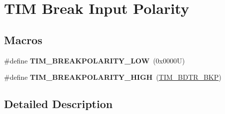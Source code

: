 \hypertarget{group___t_i_m___break___polarity}{}\section{T\+IM Break Input Polarity}
\label{group___t_i_m___break___polarity}
\subsection*{Macros}
\begin{DoxyCompactItemize}
\item 
\mbox{\label{group___t_i_m___break___polarity_ga3e07cb0376c1bf561341dc8befb66208}} 
\#define {\bfseries T\+I\+M\+\_\+\+B\+R\+E\+A\+K\+P\+O\+L\+A\+R\+I\+T\+Y\+\_\+\+L\+OW}~(0x0000\+U)
\item 
\mbox{\label{group___t_i_m___break___polarity_ga97c30f1134accd61e3e42ce37e472700}} 
\#define {\bfseries T\+I\+M\+\_\+\+B\+R\+E\+A\+K\+P\+O\+L\+A\+R\+I\+T\+Y\+\_\+\+H\+I\+GH}~(\hyperlink{group___peripheral___registers___bits___definition_ga3247abbbf0d00260be051d176d88020e}{T\+I\+M\+\_\+\+B\+D\+T\+R\+\_\+\+B\+KP})
\end{DoxyCompactItemize}


\subsection{Detailed Description}
